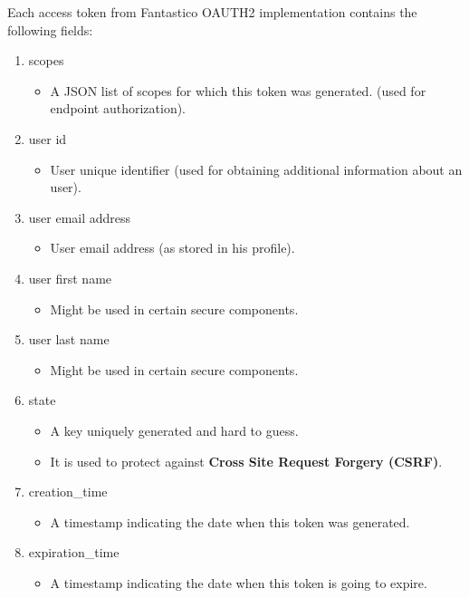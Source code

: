\documentclass[letterpaper,10pt,english]{sphinxmanual}
\begin{document}
Each access token from Fantastico OAUTH2 implementation contains the following fields:
\begin{enumerate}
\item {} 
scopes
\begin{itemize}
\item {} 
A JSON list of scopes for which this token was generated. (used for endpoint authorization).

\end{itemize}

\item {} 
user id
\begin{itemize}
\item {} 
User unique identifier (used for obtaining additional information about an user).

\end{itemize}

\item {} 
user email address
\begin{itemize}
\item {} 
User email address (as stored in his profile).

\end{itemize}

\item {} 
user first name
\begin{itemize}
\item {} 
Might be used in certain secure components.

\end{itemize}

\item {} 
user last name
\begin{itemize}
\item {} 
Might be used in certain secure components.

\end{itemize}

\item {} 
state
\begin{itemize}
\item {} 
A key uniquely generated and hard to guess.

\item {} 
It is used to protect against \textbf{Cross Site Request Forgery (CSRF)}.

\end{itemize}

\item {} 
creation\_time
\begin{itemize}
\item {} 
A timestamp indicating the date when this token was generated.

\end{itemize}

\item {} 
expiration\_time
\begin{itemize}
\item {} 
A timestamp indicating the date when this token is going to expire.

\end{itemize}

\end{enumerate}
\end{document}
